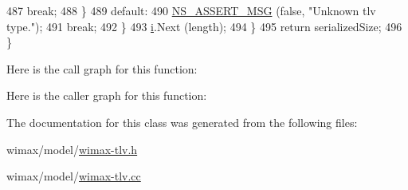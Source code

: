 \begin{DoxyCode}
487             \textcolor{keywordflow}{break};
488           \}
489         \textcolor{keywordflow}{default}:
490           \hyperlink{assert_8h_aff5ece9066c74e681e74999856f08539}{NS\_ASSERT\_MSG} (\textcolor{keyword}{false}, \textcolor{stringliteral}{"Unknown tlv type."});
491           \textcolor{keywordflow}{break};
492         \}
493       \hyperlink{bernuolliDistribution_8m_a6f6ccfcf58b31cb6412107d9d5281426}{i}.Next (length);
494     \}
495   \textcolor{keywordflow}{return} serializedSize;
496 \}
\end{DoxyCode}


Here is the call graph for this function\+:




Here is the caller graph for this function\+:




The documentation for this class was generated from the following files\+:\begin{DoxyCompactItemize}
\item 
wimax/model/\hyperlink{wimax-tlv_8h}{wimax-\/tlv.\+h}\item 
wimax/model/\hyperlink{wimax-tlv_8cc}{wimax-\/tlv.\+cc}\end{DoxyCompactItemize}
